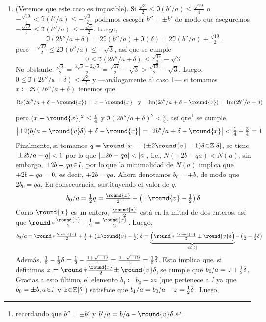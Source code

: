 \begin{sol}
\begin{enumerate}[label={\bfseries\Roman*}., wide, itemsep=1em]
\begin{enumerate}[label=\arabic*.]
    \item (Veremos que este caso es imposible). Si $\frac{\sqrt{3}}{2} \leq \Im(b'/a) \leq \frac{\sqrt{19}}{4}$ o $-\frac{\sqrt{19}}{4} < \Im(b'/a) \leq -\frac{\sqrt{3}}{2}$ podemos escoger $b'' = \pm b'$ de modo que aseguremos $-\frac{\sqrt{19}}{4} \leq \Im(b''/a) \leq -\frac{\sqrt{3}}{2}$. Luego,
    \[
    \Im(2b''/a + \delta) = 2\Im(b''/a) + \Im(\delta) = 2\Im(b''/a) + \tfrac{\sqrt{19}}{2} 
    \]
    pero $-\frac{\sqrt{19}}{2} \leq 2\Im(b''/a) \leq -\sqrt{3}$, así que se cumple
    \[
    0 \leq \Im(2b''/a + \delta) \leq \tfrac{\sqrt{19}}{2} - \sqrt{3}
    \]
    No obstante, $\frac{\sqrt{3}}{2} = \frac{3\sqrt{3} - 2\sqrt{3}}{2} = \frac{\sqrt{27}}{2} - \sqrt{3} > \frac{\sqrt{19}}{2} - \sqrt{3}$. Luego, $0 \leq \Im(2b''/a + \delta) < \frac{\sqrt{3}}{2}$ y ---análogamente al caso 1--- si tomamos $x \coloneq \Re(2b''/a + \delta)$ tenemos que
    \[
    \Re(2b''/a + \delta - \round{x}) = x - \round{x}
    \quad\text{y}\quad
    \Im(2b''/a + \delta - \round{x}) = \Im(2b''/a + \delta)
    \]
    pero $(x - \round{x})^2 \leq \tfrac{1}{4}$ y $\Im(2b''/a + \delta)^2 < \tfrac{3}{4}$, así que\footnote{recordando que $b'' = \pm b'$ y $b'/a = b/a - \round{v}\delta$.} se cumple
    \[
    \abs\big{\pm2(b/a - \round{v}\delta) + \delta - \round{x}}%
    =\abs\big{2b''/a + \delta - \round{x}}%
    < \tfrac14 + \tfrac34 = 1
    \]
    Finalmente, si tomamos $q = \round{x} + (\pm2\round{v} - 1)\delta \en \mathbb{Z}[\delta]$, se tiene $\abs{\pm2b/a - q} < 1$ por lo que $\abs{\pm2b - qa} < \abs{a}$, i.e., $N(\pm2b - qa) < N(a)$; sin embargo, $\pm2b - qa \en I$, por lo que la minimalidad de $N(a)$ implica que $\pm2b - qa = 0$, es decir, $\pm2b = qa$. Ahora denotamos $b_0 = \pm b$, de modo que $2b_0 = qa$. En consecuencia, sustituyendo el valor de $q$,
    \[
    b_0/a = \tfrac12q = \tfrac{\round{x}}{2} + \left(\pm\round{v} - \tfrac12\right)\delta
    \]
    Como $\round{x}$ es un entero, $\frac{\round{x}}{2}$ está en la mitad de dos enteros, así que $\round*{\!\frac{\round{x}}{2}\!} + \frac12 = \frac{\round{x}}{2}$. Luego,
    \[
    b_0/a%
    = \round*{\tfrac{\round{x}}{2}} + \tfrac12 + \left(\pm\round{v} - \tfrac12\right)\delta%
    = \underbrace{\left(\round*{\tfrac{\round{x}}{2}} \pm \round{v}\delta\right)}_{\en\mathbb{Z}[\delta]} + \left(\tfrac12 - \tfrac12\delta\right)
    \]
    Además, $\tfrac12-\tfrac12\delta = \tfrac{1}{2} - \tfrac{1 + \sqrt{-19}}{4} = \tfrac{1-\sqrt{-19}}{4} = \tfrac12\ubar{\delta}$. Esto implica que, si definimos $z \coloneq \round*{\!\tfrac{\round{x}}{2}\!} \pm \round{v}\delta$, se cumple que $b_0/a = z + \tfrac12\ubar\delta$. Gracias a esto último, el elemento $b_1 \coloneq b_0 - za$ (que pertenece a $I$ ya que $b_0 = \pm b,a\en I$ y $z \en\mathbb{Z}[\delta]$) satisface que $b_1/a = b_0/a - z = \tfrac12\ubar\delta$. Luego,

\end{enumerate}
\end{enumerate}
\end{sol}
